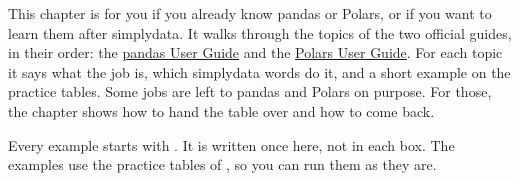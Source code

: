 

This chapter is for you if you already know pandas or Polars, or if you want to learn them after
simplydata. It walks through the topics of the two official guides, in their order:
the \href{https://pandas.pydata.org/docs/user_guide/index.html}{pandas User Guide} and the
\href{https://docs.pola.rs/user-guide/getting-started/}{Polars User Guide}. For each topic it says
what the job is, which simplydata words do it, and a short example on the practice tables. Some jobs
are left to pandas and Polars on purpose. For those, the chapter shows how to hand the table over and
how to come back.

Every example starts with . It is written once here, not in each
box. The examples use the practice tables of , so you can run them as they
are.


